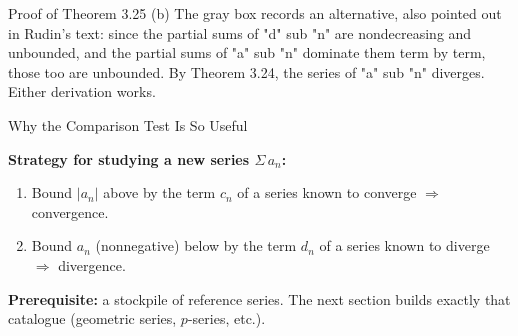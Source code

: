 \documentclass[aspectratio=169,12pt,t]{beamer}
\begin{document}
{\begin{frame}{Proof of Theorem 3.25 (b)}
{    The gray box records an alternative, also pointed out in
    Rudin's text: since the partial sums of "d" sub "n" are
    nondecreasing and unbounded, and the partial sums of "a" sub
    "n" dominate them term by term, those too are unbounded. By
    Theorem 3.24, the series of "a" sub "n" diverges. Either
    derivation works.
  }
\end{frame}

\begin{frame}{Why the Comparison Test Is So Useful}
  \begin{hlbox}
    \textbf{Strategy for studying a new series $\Sigma\, a_n$:}
    \begin{enumerate}
      \item Bound $|a_n|$ above by the term $c_n$ of a series
        \alert{known to converge} $\Longrightarrow$ convergence.
      \item Bound $a_n$ (nonnegative) below by the term $d_n$ of a
        series \alert{known to diverge} $\Longrightarrow$ divergence.
    \end{enumerate}
  \end{hlbox}

  \vspace{0.4em}
  \begin{hlbox}
    \textbf{Prerequisite:} a stockpile of reference series. The
    next section builds exactly that catalogue (geometric series,
    $p$-series, etc.).
  \end{hlbox}

\end{frame}
}
\end{document}
